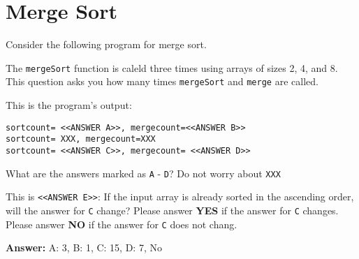 \newpage
\section{Merge Sort} 

Consider the following program for  merge sort.

\resetlinenumber[1]
\linenumbers
\begin{tt}
  
\end{tt}
\nolinenumbers

The {\tt mergeSort} function is caleld three times
using arrays of sizes 2, 4, and 8.  This question asks
you how many times {\tt mergeSort} and {\tt merge} are called.

This is the program's output:

\begin{verbatim}
sortcount= <<ANSWER A>>, mergecount=<<ANSWER B>>
sortcount= XXX, mergecount=XXX
sortcount= <<ANSWER C>>, mergecount= <<ANSWER D>>
\end{verbatim}

What are the answers marked as {\tt A} - {\tt D}?
Do not worry about {\tt XXX}


This is {\tt <<ANSWER E>>}: 
If the input array is already sorted in the ascending order, will
the answer for {\tt C} change? Please answer {\bf YES}
if the answer for {\tt C} changes.
Please answer {\bf NO}
if the answer for {\tt C} does not chang. 


\ifexam


\else


{\bf Answer:}
A: 3, B: 1, C: 15, D: 7, No
\fi
